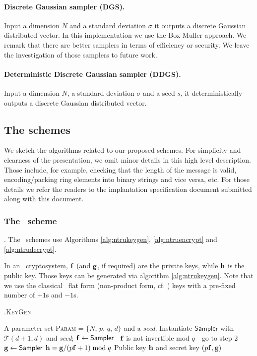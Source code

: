 \documentclass{llncs}
\newcommand{\bff}{{\bf f}}
\newcommand{\bfg}{{\bf g}}
\newcommand{\bfh}{{\bf h}}
\newcommand{\ntru}{{\sf{NTRU}}}
\newcommand{\ntrupke}{{\sf{ntru-pke}}}
\newcommand{\keygen}{{\textsc{KeyGen}}}
\newcommand{\<}{\langle}
\renewcommand{\>}{\rangle}
\newcommand{\LineIf}[2]{ \STATE \algorithmicif\ {#1}\ \algorithmicthen\ {#2} \algorithmicend\ \algorithmicif }
\begin{document}
\paragraph{Discrete Gaussian sampler (\textsf{DGS}).} Input a
dimension $N$ and a standard deviation $\sigma$ it outputs a discrete Gaussian distributed vector. In this implementation we use the Box-Muller
approach. We remark that there are better samplers in terms of 
efficiency or security. We leave the investigation of those samplers
to future work.

\paragraph{Deterministic Discrete Gaussian sampler (\textsf{DDGS}).}Input a
dimension $N$, a standard deviation $\sigma$ and
a seed $s$, it deterministically outputs a discrete Gaussian distributed vector.


\subsection{The schemes}
We sketch the algorithms related to our proposed schemes. For simplicity
and clearness of the presentation, we omit minor details 
in this high level description. Those include, for example, checking that
the length of the message is valid, encoding/packing ring elements into binary strings and vice versa, etc.
For those details we refer the readers to the implantation specification
document submitted along with this document.

\subsubsection{The \ntrupke~scheme}. The \ntrupke~schemes use Algorithms
\ref{alg:ntrukeygen}, \ref{alg:ntruencrypt} and \ref{alg:ntrudecrypt}.

In an \ntru~cryptosystem, $\bff$ (and $\bfg$, if
required) are 
the private keys, while $\bfh$ is the public key.
Those keys can be generated via algorithm
\ref{alg:ntrukeygen}.
Note that we use the classical \ntru~flat form (non-product form, cf. \cite{DBLP:conf/ctrsa/HoffsteinPSSWZ17}) keys 
with a pre-fixed number of $+1$s and $-1$s.

\begin{algorithm}
\caption{{\ntrupke}.\keygen}
\begin{algorithmic}[1]\label{alg:ntrukeygen}
\REQUIRE A parameter set \textsc{Param} = $\{N$, $p$, $q$, $d\}$ and a {\em seed}.
\STATE Instantiate $\textsf{Sampler}$ with $\mathcal{T}(d+1,d)$ and {\em seed};
\STATE $\bff \gets \textsf{Sampler}$  
\LineIf {$\bff$ is not invertible mod $q$} {go to step 2}
\STATE $\bfg \gets \textsf{Sampler}$
\STATE $\bfh = \bfg/(p\bff+1) \bmod q$
\ENSURE Public key $\bfh$ and secret key $(p\bff,\bfg)$

\end{algorithmic}
\end{algorithm}
\end{document}
